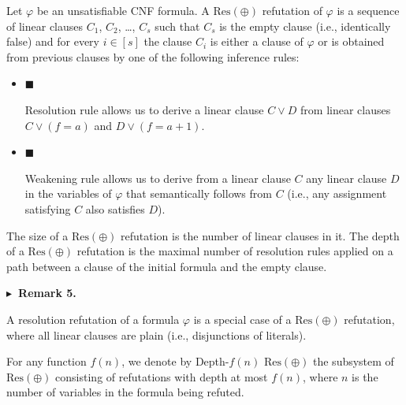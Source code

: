 Let $\varphi$ be an unsatisfiable CNF formula.
A $\mathrm{Res}(\oplus)$ refutation of $\varphi$ is a sequence of linear clauses
$C_{1}$, $C_{2}$, …, $C_{s}$ such that $C_{s}$ is the empty clause (i.e., identically false) and
for every $i\in[s]$ the clause $C_{i}$ is either a clause of $\varphi$ or is obtained from
previous clauses by one of the following inference rules:\par


\begin{itemize}


\item 
$\blacksquare$ 


Resolution rule allows us to derive a linear clause $C\lor D$
from linear clauses $C\lor(f=a)$ and $D\lor(f=a+1)$.\par





\item 
$\blacksquare$ 


Weakening rule allows us to derive from a linear clause $C$ any
linear clause $D$ in the variables of $\varphi$
that semantically follows from $C$ (i.e., any assignment satisfying $C$
also satisfies $D$).\par





\end{itemize}



The size of a $\mathrm{Res}(\oplus)$ refutation is the number of linear clauses in it.
The depth of a $\mathrm{Res}(\oplus)$ refutation is the
maximal number of resolution rules applied on a path between a clause of the initial
formula and the empty clause.\par



\par\medskip\noindent\textbf{
$\blacktriangleright$ Remark 5.
}\par



A resolution refutation of a formula $\varphi$ is a special case of a $\mathrm{Res}(\oplus)$ refutation,
where all linear clauses are plain (i.e., disjunctions of literals).\par




For any function $f(n)$, we denote by Depth-$f(n)$ $\mathrm{Res}(\oplus)$ the subsystem of $\mathrm{Res}(\oplus)$
consisting of refutations with depth at most $f(n)$, where $n$ is the number of variables in
the formula being refuted.\par



